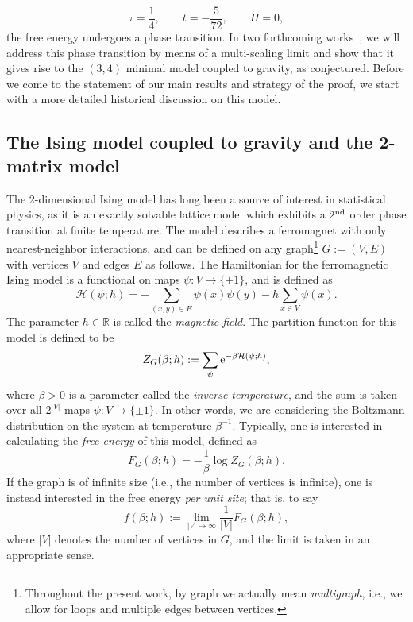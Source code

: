 \documentclass[10pt,a4paper]{amsart}
\numberwithin{equation}{section}
\begin{document}
 \begin{equation}\label{multicritical-point}
 \tau = \frac{1}{4},\qquad t = -\frac{5}{72}, \qquad H=0,
 \end{equation}
 the free energy undergoes a phase transition. In two forthcoming works~\cite{DHL3, DHL2}, we will address this phase transition by means of a multi-scaling limit and show that it gives rise to the $(3,4)$ minimal model coupled to gravity, as conjectured. Before we come to the statement of our main results and strategy of the proof, we start with a more detailed historical discussion on this model.


\subsection{The Ising model coupled to gravity and the 2-matrix model}
The 2-dimensional Ising model has long been a source of interest in statistical physics, as it is an exactly solvable lattice model which exhibits a $2^{\rm nd}$
order phase transition at finite temperature. The model describes a ferromagnet with only nearest-neighbor interactions, and can be defined on
any graph\footnote{Throughout the present work, by graph we actually mean \textit{multigraph}, i.e., we allow for loops and multiple edges between vertices.} $G := (V,E)$ with vertices $V$ and edges $E$ as follows. The Hamiltonian for the ferromagnetic Ising model is a functional on maps $\psi\colon V\to \{\pm 1\}$, and is defined as
 \begin{equation*}
 \mathcal{H}(\psi;h) = -\sum_{(x,y)\in E} \psi(x)\psi(y) - h \sum_{x\in V} \psi(x).
 \end{equation*}
The parameter $h \in \mathbb{R}$ is called the \textit{magnetic field}.
The partition function for this model is defined to be
 \begin{equation*} %
 Z_G(\beta;h) := \sum_{\psi} {\rm e}^{-\beta \mathcal{H}(\psi;h)},
 \end{equation*}
where $\beta > 0$ is a parameter called the \textit{inverse temperature}, and the sum is taken over all $2^{|V|}$ maps $\psi\colon V \to \{\pm 1\}$. In other words, we are considering the Boltzmann distribution on the system at temperature $\beta^{-1}$. Typically, one is interested in calculating the \textit{free energy} of this model, defined as
 \begin{equation*}
 F_G(\beta;h) = -\frac{1}{\beta} \log Z_G(\beta;h).
 \end{equation*}
If the graph is of infinite size (i.e., the number of vertices is infinite), one is instead interested in the free energy \textit{per unit site};
that is, to say
 \begin{equation*}
 f(\beta;h) := \lim_{|V|\to \infty} \frac{1}{|V|} F_G(\beta;h),
 \end{equation*}
where $|V|$ denotes the number of vertices in $G$, and the limit is taken in an appropriate sense.
\end{document}
